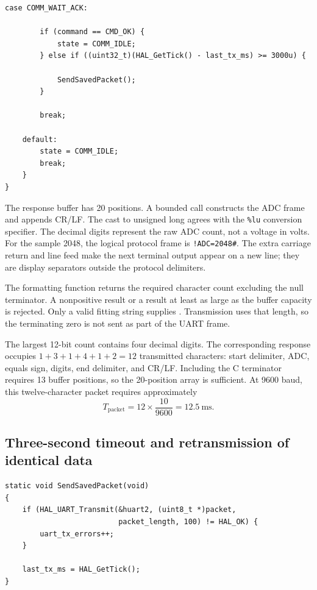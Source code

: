 \documentclass[a4paper]{article}
\newcommand{\code}[1]{\texttt{\detokenize{#1}}}
\newcommand{\topic}[1]{\subsection{#1}}
\begin{document}
\par\noindent\begin{minipage}{\linewidth}
\begin{lstlisting}[caption={Communication FSM with checked acquisition and saved-packet retries (continued)},firstnumber=34]
    case COMM_WAIT_ACK:

        if (command == CMD_OK) {
            state = COMM_IDLE;
        } else if ((uint32_t)(HAL_GetTick() - last_tx_ms) >= 3000u) {

            SendSavedPacket();
        }

        break;

    default:
        state = COMM_IDLE;
        break;
    }
}
\end{lstlisting}
\end{minipage}\par

The response buffer has 20 positions. A bounded \code{snprintf} call constructs
the ADC frame and appends CR/LF.
The cast to unsigned long agrees with the \texttt{\%lu} conversion specifier.
The decimal digits represent the raw ADC count, not a voltage in volts.
For the sample 2048, the logical protocol frame is \texttt{!ADC=2048\#}.
The extra carriage return and line feed make the next terminal output appear
on a new line; they are display separators outside the protocol delimiters.

The formatting function returns the required character count excluding the
null terminator. A nonpositive result or a result at least as large as the
buffer capacity is rejected. Only a valid fitting string supplies
\code{packet_length}. Transmission uses that length, so the terminating zero
is not sent as part of the UART frame.

The largest 12-bit count contains four decimal digits. The corresponding
response occupies \(1+3+1+4+1+2=12\) transmitted characters: start delimiter,
ADC, equals sign, digits, end delimiter, and CR/LF. Including the C terminator
requires 13 buffer positions, so the 20-position array is sufficient. At 9600
baud, this twelve-character packet requires approximately
\[
T_{\mathrm{packet}}=12\times\frac{10}{9600}=12.5\ \mathrm{ms}.
\]


\topic{Three-second timeout and retransmission of identical data}

\par\noindent\begin{minipage}{\linewidth}
\begin{lstlisting}[caption={Transmit the saved packet and record the new waiting origin},firstnumber=1]
static void SendSavedPacket(void)
{
    if (HAL_UART_Transmit(&huart2, (uint8_t *)packet,
                          packet_length, 100) != HAL_OK) {
        uart_tx_errors++;
    }

    last_tx_ms = HAL_GetTick();
}
\end{lstlisting}
\end{minipage}\par
\end{document}

